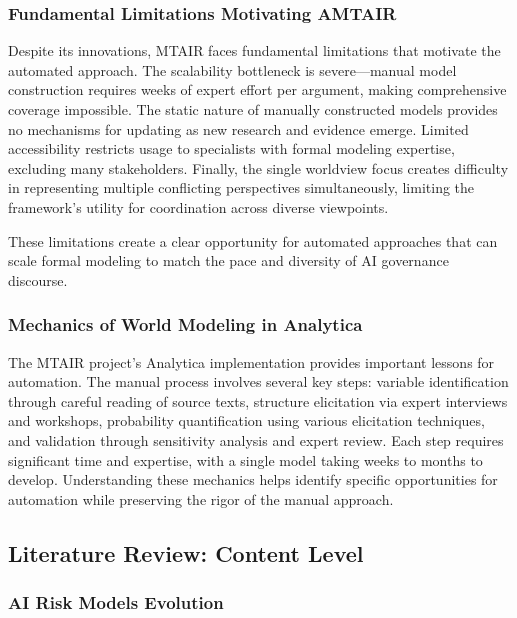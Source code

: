 \documentclass[
  11pt,
  letterpaper,
]{book}
\begin{document}
\subsubsection{Fundamental Limitations Motivating
AMTAIR}\label{sec-mtair-limitations}

Despite its innovations, MTAIR faces fundamental limitations that
motivate the automated approach. The scalability bottleneck is
severe---manual model construction requires weeks of expert effort per
argument, making comprehensive coverage impossible. The static nature of
manually constructed models provides no mechanisms for updating as new
research and evidence emerge. Limited accessibility restricts usage to
specialists with formal modeling expertise, excluding many stakeholders.
Finally, the single worldview focus creates difficulty in representing
multiple conflicting perspectives simultaneously, limiting the
framework's utility for coordination across diverse viewpoints.

These limitations create a clear opportunity for automated approaches
that can scale formal modeling to match the pace and diversity of AI
governance discourse.

\subsubsection{Mechanics of World Modeling in
Analytica}\label{sec-analytica-mechanics}

The MTAIR project's Analytica implementation provides important lessons
for automation. The manual process involves several key steps: variable
identification through careful reading of source texts, structure
elicitation via expert interviews and workshops, probability
quantification using various elicitation techniques, and validation
through sensitivity analysis and expert review. Each step requires
significant time and expertise, with a single model taking weeks to
months to develop. Understanding these mechanics helps identify specific
opportunities for automation while preserving the rigor of the manual
approach.

\subsection{Literature Review: Content
Level}\label{sec-content-literature}

\subsubsection{AI Risk Models
Evolution}\label{sec-risk-models-evolution}
\end{document}
